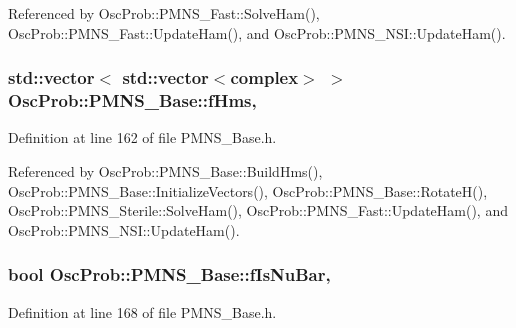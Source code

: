 Referenced by Osc\+Prob\+::\+P\+M\+N\+S\+\_\+\+Fast\+::\+Solve\+Ham(), Osc\+Prob\+::\+P\+M\+N\+S\+\_\+\+Fast\+::\+Update\+Ham(), and Osc\+Prob\+::\+P\+M\+N\+S\+\_\+\+N\+S\+I\+::\+Update\+Ham().

\subsubsection[{\texorpdfstring{f\+Hms}{fHms}}]{\setlength{\rightskip}{0pt plus 5cm}std\+::vector$<$ std\+::vector$<${\bf complex}$>$ $>$ Osc\+Prob\+::\+P\+M\+N\+S\+\_\+\+Base\+::f\+Hms\hspace{0.3cm}{\ttfamily [protected]}, {\ttfamily [inherited]}}\hypertarget{classOscProb_1_1PMNS__Base_adf5901166216e8c7a5cff2092952f473}{}\label{classOscProb_1_1PMNS__Base_adf5901166216e8c7a5cff2092952f473}


Definition at line 162 of file P\+M\+N\+S\+\_\+\+Base.\+h.



Referenced by Osc\+Prob\+::\+P\+M\+N\+S\+\_\+\+Base\+::\+Build\+Hms(), Osc\+Prob\+::\+P\+M\+N\+S\+\_\+\+Base\+::\+Initialize\+Vectors(), Osc\+Prob\+::\+P\+M\+N\+S\+\_\+\+Base\+::\+Rotate\+H(), Osc\+Prob\+::\+P\+M\+N\+S\+\_\+\+Sterile\+::\+Solve\+Ham(), Osc\+Prob\+::\+P\+M\+N\+S\+\_\+\+Fast\+::\+Update\+Ham(), and Osc\+Prob\+::\+P\+M\+N\+S\+\_\+\+N\+S\+I\+::\+Update\+Ham().

\subsubsection[{\texorpdfstring{f\+Is\+Nu\+Bar}{fIsNuBar}}]{\setlength{\rightskip}{0pt plus 5cm}bool Osc\+Prob\+::\+P\+M\+N\+S\+\_\+\+Base\+::f\+Is\+Nu\+Bar\hspace{0.3cm}{\ttfamily [protected]}, {\ttfamily [inherited]}}\hypertarget{classOscProb_1_1PMNS__Base_a0ebaeaefab36a3ff381c6293faedfdd6}{}\label{classOscProb_1_1PMNS__Base_a0ebaeaefab36a3ff381c6293faedfdd6}


Definition at line 168 of file P\+M\+N\+S\+\_\+\+Base.\+h.



